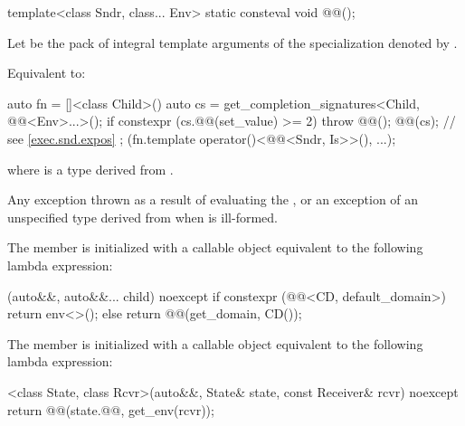 \begin{itemdecl}
template<class Sndr, class... Env>
  static consteval void @@();
\end{itemdecl}

\begin{itemdescr}
\pnum
Let  be the pack of integral template arguments of
the  specialization denoted by
.

\pnum
\effects
Equivalent to:
\begin{codeblock}
auto fn = []<class Child>() {
  auto cs = get_completion_signatures<Child, @@<Env>...>();
  if constexpr (cs.@@(set_value) >= 2)
    throw @@();
  @@(cs); // see \ref{exec.snd.expos}
};
(fn.template operator()<@@<Sndr, Is>>(), ...);
\end{codeblock}
where  is
a type derived from .

\pnum
\throws
Any exception thrown as a result of evaluating the , or
an exception of an unspecified type
derived from  when  is ill-formed.
\end{itemdescr}

\pnum
The member 
is initialized with a callable object
equivalent to the following lambda expression:
\begin{codeblock}
[](auto&&, auto&&... child) noexcept {
  if constexpr (@@<CD, default_domain>) {
    return env<>();
  } else {
    return @@(get_domain, CD());
  }
}
\end{codeblock}

\pnum
The member 
is initialized with a callable object
equivalent to the following lambda expression:
\begin{codeblock}
[]<class State, class Rcvr>(auto&&, State& state, const Receiver& rcvr) noexcept {
  return @@(state.@@, get_env(rcvr));
}
\end{codeblock}


